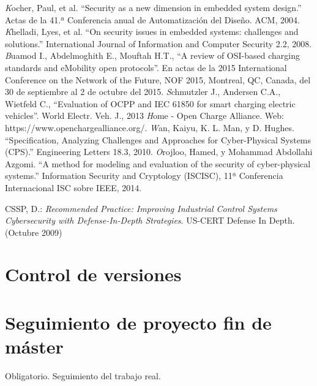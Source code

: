 \documentclass[12pt,a4paper,onecolumn,oneside]{report}
\begin{document}
\begin{thebibliography}{1}
 \textit Kocher, Paul, et al. ``Security as a new dimension in embedded system design.” Actas de la 41.ª Conferencia anual de Automatización del Diseño. ACM, 2004.
 \textit Khelladi, Lyes, et al. ``On security issues in embedded systems: challenges and solutions.” International Journal of Information and Computer Security 2.2, 2008.
 \textit Buamod I., Abdelmoghith E.,  Mouftah H.T., ``A review of OSI-based charging standards and eMobility open protocols”. En actas de la 2015 International Conference on the Network of the Future, NOF 2015, Montreal, QC, Canada, del 30 de septiembre al 2 de octubre del 2015.
 \textit Schmutzler J., Andersen C.A., Wietfeld C., ``Evaluation of OCPP and IEC 61850 for smart charging electric
vehicles”. World Electr. Veh. J., 2013
 \textit Home - Open Charge Alliance. Web: https://www.openchargealliance.org/.
 \textit Wan, Kaiyu, K. L. Man, y D. Hughes. ``Specification, Analyzing Challenges and Approaches for Cyber-Physical Systems (CPS).” Engineering Letters 18.3, 2010.
 \textit Orojloo, Hamed, y Mohammad Abdollahi Azgomi. ``A method for modeling and evaluation of the security of cyber-physical systems.” Information Security and Cryptology (ISCISC), 11ª Conferencia Internacional ISC sobre IEEE, 2014.

{CSSP, D.}:
\newblock \textit{Recommended Practice: Improving Industrial Control Systems
  Cybersecurity with Defense-In-Depth Strategies}.
\newblock US-CERT Defense In Depth. (Octubre 2009)

\end{thebibliography}



\renewcommand{\appendixname}{Anexo}
\appendix

\chapter{Control de versiones}
\label{Control de versiones}




\chapter{Seguimiento de proyecto fin de máster}
\label{Seguimiento de proyecto fin de máster}


Obligatorio. Seguimiento del trabajo real.
\end{document}
